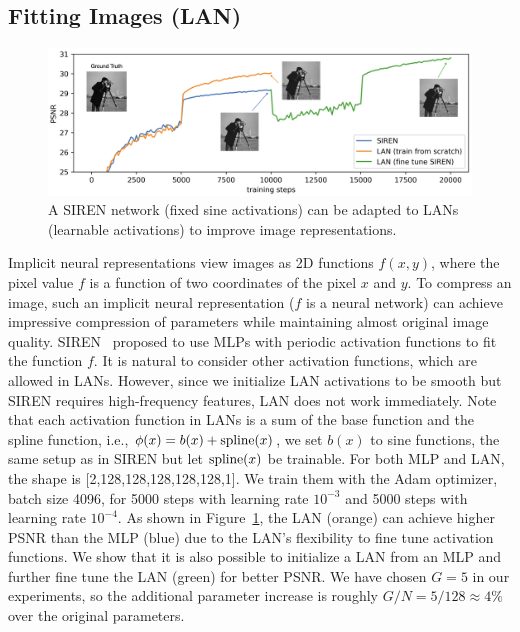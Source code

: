 \documentclass{article}
\numberwithin{equation}{section}
\numberwithin{figure}{section}
\begin{document}
\subsection{Fitting Images (LAN)}\label{app:lan-siren}

\begin{figure}[t]
    \centering
    \includegraphics[width=1\linewidth]{figs/siren.png}
    \caption{A SIREN network (fixed sine activations) can be adapted to LANs (learnable activations) to improve image representations.}
    \label{fig:siren}
\end{figure}

Implicit neural representations view images as 2D functions $f(x,y)$, where the pixel value $f$ is a function of two coordinates of the pixel $x$ and $y$. To compress an image, such an implicit neural representation ($f$ is a neural network) can achieve impressive compression of parameters while maintaining almost original image quality. SIREN~\cite{sitzmann2020implicit} proposed to use MLPs with periodic activation functions to fit the function $f$. It is natural to consider other activation functions, which are allowed in LANs. However, since we initialize LAN activations to be smooth but SIREN requires high-frequency features, LAN does not work immediately. Note that each activation function in LANs is a sum of the base function and the spline function, i.e., $\phi(x)=b(x)+{\rm spline}(x)$, we set $b(x)$ to sine functions, the same setup as in SIREN but let ${\rm spline}(x)$ be trainable. For both MLP and LAN, the shape is [2,128,128,128,128,128,1]. We train them with the Adam optimizer, batch size 4096, for 5000 steps with learning rate $10^{-3}$ and 5000 steps with learning rate $10^{-4}$. As shown in Figure~\ref{fig:siren}, the LAN (orange) can achieve higher PSNR than the MLP (blue) due to the LAN's flexibility to fine tune activation functions. We show that it is also possible to initialize a LAN from an MLP and further fine tune the LAN (green) for better PSNR. We have chosen $G=5$ in our experiments, so the additional parameter increase is roughly $G/N=5/128\approx 4\%$ over the original parameters.
\end{document}
